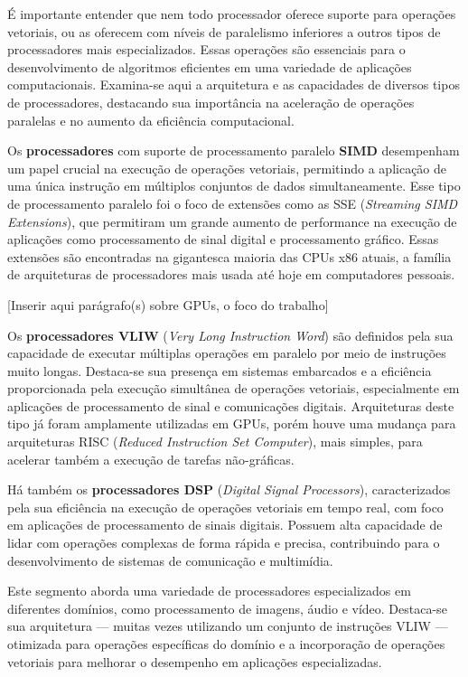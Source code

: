 \documentclass[12pt, %
openright, 
oneside, %
a4paper,    %
brazil]{facom-ufu-abntex2}
\begin{document}
É importante entender que nem todo processador oferece suporte para operações vetoriais, ou as oferecem com níveis de paralelismo inferiores a outros tipos de processadores mais especializados. Essas operações são essenciais para o desenvolvimento de algoritmos eficientes em uma variedade de aplicações computacionais. Examina-se aqui a arquitetura e as capacidades de diversos tipos de processadores, destacando sua importância na aceleração de operações paralelas e no aumento da eficiência computacional.

Os \textbf{processadores} com suporte de processamento paralelo \textbf{SIMD} desempenham um papel crucial na execução de operações vetoriais, permitindo a aplicação de uma única instrução em múltiplos conjuntos de dados simultaneamente. Esse tipo de processamento paralelo foi o foco de extensões como as SSE (\textit{Streaming SIMD Extensions}), que permitiram um grande aumento de performance na execução de aplicações como processamento de sinal digital e processamento gráfico. Essas extensões são encontradas na gigantesca maioria das CPUs x86 atuais, a família de arquiteturas de processadores mais usada até hoje em computadores pessoais.

[Inserir aqui parágrafo(s) sobre GPUs, o foco do trabalho]

Os \textbf{processadores VLIW} (\textit{Very Long Instruction Word}) são definidos pela sua capacidade de executar múltiplas operações em paralelo por meio de instruções muito longas. Destaca-se sua presença em sistemas embarcados e a eficiência proporcionada pela execução simultânea de operações vetoriais, especialmente em aplicações de processamento de sinal e comunicações digitais. Arquiteturas deste tipo já foram amplamente utilizadas em GPUs, porém houve uma mudança para arquiteturas RISC (\textit{Reduced Instruction Set Computer}), mais simples, para acelerar também a execução de tarefas não-gráficas.

Há também os \textbf{processadores DSP} (\textit{Digital Signal Processors}), caracterizados pela sua eficiência na execução de operações vetoriais em tempo real, com foco em aplicações de processamento de sinais digitais. Possuem alta capacidade de lidar com operações complexas de forma rápida e precisa, contribuindo para o desenvolvimento de sistemas de comunicação e multimídia.

Este segmento aborda uma variedade de processadores especializados em diferentes domínios, como processamento de imagens, áudio e vídeo. Destaca-se sua arquitetura --- muitas vezes utilizando um conjunto de instruções VLIW --- otimizada para operações específicas do domínio e a incorporação de operações vetoriais para melhorar o desempenho em aplicações especializadas.
\end{document}
